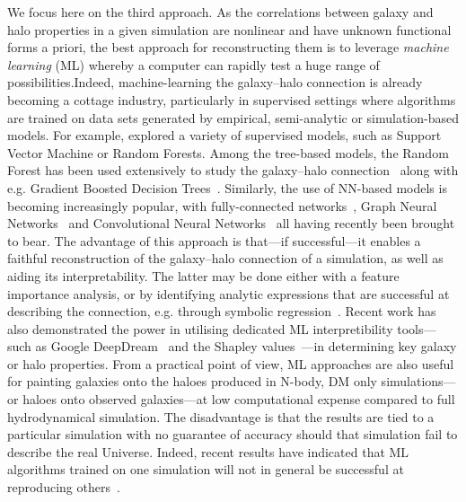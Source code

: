 \documentclass[useAMS,usenatbib]{mnras}
\begin{document}
We focus here on the third approach. As the correlations between galaxy and halo properties in a given simulation are nonlinear and have unknown functional forms a priori, the best approach for reconstructing them is to leverage \emph{machine learning} (ML) whereby a computer can rapidly test a huge range of possibilities.Indeed, machine-learning the galaxy--halo connection is already becoming a cottage industry, particularly in supervised settings where algorithms are trained on data sets generated by empirical, semi-analytic or simulation-based models. For example, \cite{vonMarttens_2021} explored a variety of supervised models, such as Support Vector Machine or Random Forests. Among the tree-based models, the Random Forest has been used extensively to study the galaxy--halo connection~\citep{Man_2019,Delgado_2021,Lovell_2021} along with e.g. Gradient Boosted Decision Trees~\citep{Chen_2021}. Similarly, the use of \ac{NN}-based models
is becoming increasingly popular, with fully-connected networks~\citep{Moster_GalaxyNet,Shao_2021}, Graph Neural Networks~\citep{Villanueva_Domingo_2021} and Convolutional Neural Networks~\citep{de_los_Rios_2021} all having recently been brought to bear. The advantage of this approach is that---if successful---it enables a faithful reconstruction of the galaxy--halo connection of a simulation, as well as aiding its interpretability. The latter may be done either with a feature importance analysis, or by identifying analytic expressions that are successful at describing the connection, e.g. through symbolic regression~\citep{Delgado_2021}. Recent work has also demonstrated the power in utilising dedicated ML interpretibility tools---such as Google DeepDream~\citep{Ntampaka2019MLDeepDream} and the Shapley values~\citep{Machado2021SHAP, Anbajagane_2022}---in determining key galaxy or halo properties. From a practical point of view, ML approaches are also useful for painting galaxies onto the haloes produced in N-body, \ac{DM} only simulations---or haloes onto observed galaxies---at low computational expense compared to full hydrodynamical simulation. The disadvantage is that the results are tied to a particular simulation with no guarantee of accuracy should that simulation fail to describe the real Universe. Indeed, recent results have indicated that ML algorithms trained on one simulation will not in general be successful at reproducing others~\citep{Villaescusa_Navarro_2021}.
\end{document}
